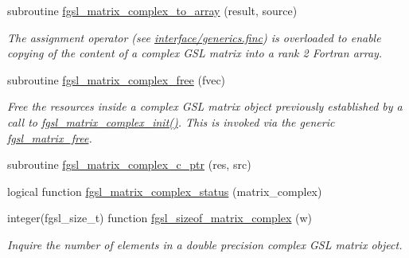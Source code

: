 \begin{DoxyCompactItemize}
subroutine \hyperlink{array_8finc_a4b17724c0c305144fdec66507f8638f7}{fgsl\-\_\-matrix\-\_\-complex\-\_\-to\-\_\-array} (result, source)
\begin{DoxyCompactList}\small\item\em The assignment operator (see \hyperlink{generics_8finc}{interface/generics.\-finc}) is overloaded to enable copying of the content of a complex G\-S\-L matrix into a rank 2 Fortran array. \end{DoxyCompactList}\item 
subroutine \hyperlink{array_8finc_aa26219798c626c7bf6a0a85403f3dbcf}{fgsl\-\_\-matrix\-\_\-complex\-\_\-free} (fvec)
\begin{DoxyCompactList}\small\item\em Free the resources inside a complex G\-S\-L matrix object previously established by a call to \hyperlink{array_8finc_af7461bad6c35fe6dde17e9c06bbc5cd0}{fgsl\-\_\-matrix\-\_\-complex\-\_\-init()}. This is invoked via the generic \hyperlink{interfacefgsl__matrix__free}{fgsl\-\_\-matrix\-\_\-free}. \end{DoxyCompactList}\item 
subroutine \hyperlink{array_8finc_a9f0f952485ef9707174a52c5af21a9a2}{fgsl\-\_\-matrix\-\_\-complex\-\_\-c\-\_\-ptr} (res, src)
\item 
logical function \hyperlink{array_8finc_a3fa8db2b747286e805d60065f6d16640}{fgsl\-\_\-matrix\-\_\-complex\-\_\-status} (matrix\-\_\-complex)
\item 
integer(fgsl\-\_\-size\-\_\-t) function \hyperlink{array_8finc_a14d82675b93fa2b453caf33df1e567a1}{fgsl\-\_\-sizeof\-\_\-matrix\-\_\-complex} (w)
\begin{DoxyCompactList}\small\item\em Inquire the number of elements in a double precision complex G\-S\-L matrix object. \end{DoxyCompactList}\end{DoxyCompactItemize}


